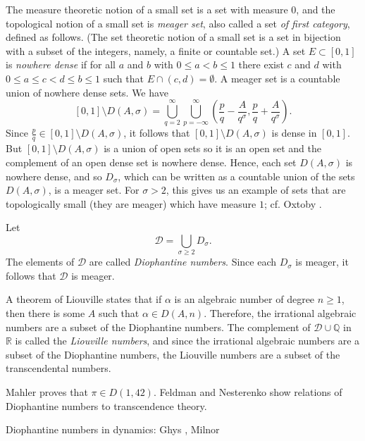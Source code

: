 \documentclass{article}
\begin{document}
The measure theoretic notion of a small set is a set with measure $0$, and  the topological notion of a small set is {\em meager set}, also called a set {\em of first category}, defined as follows. (The set theoretic notion of a small set is a set in bijection with a subset of the integers, namely, a finite or countable set.)
A set $E \subset [0,1]$ is {\em nowhere dense} if for all $a$ and $b$ with $0 \leq a<b \leq 1$ there exist $c$ and $d$ with $0 \leq a \leq c < d \leq b \leq 1$ such that $E \cap (c,d)=\emptyset$. A meager set is a countable union of nowhere dense sets. We have
\[
[0,1] \setminus D(A,\sigma)=\bigcup_{q=2}^\infty \bigcup_{p=-\infty}^\infty \left(\frac{p}{q}-\frac{A}{q^\sigma},\frac{p}{q}+\frac{A}{q^\sigma}\right).
\]
Since $\frac{p}{q} \in [0,1] \setminus D(A,\sigma)$, it follows that $[0,1] \setminus D(A,\sigma)$ is dense in $[0,1]$. But $[0,1] \setminus D(A,\sigma)$ is a union of open sets so it is an open set and the complement of an open dense set is nowhere dense. Hence, each set $D(A,\sigma)$ is nowhere dense, and so $D_\sigma$, which can be written as a countable union of
the sets $D(A,\sigma)$, is a meager set. For $\sigma>2$, this gives us an example of sets that are topologically small (they are meager) which have measure $1$; cf. 
Oxtoby \cite[Chapter 2]{oxtoby}.

Let
\[
\mathscr{D}=\bigcup_{\sigma \geq 2} D_\sigma.
\]
The elements of $\mathscr{D}$ are called {\em Diophantine numbers}. Since each $D_\sigma$ is meager, it follows that $\mathscr{D}$ is meager.

A theorem of Liouville states that if $\alpha$ is an algebraic number of degree $n \geq 1$, then there is some $A$ such that $\alpha
\in D(A,n)$. Therefore, the irrational algebraic numbers are a subset of the Diophantine numbers. The complement of $\mathscr{D} \cup \mathbb{Q}$ in $\mathbb{R}$ is called
the {\em Liouville numbers}, and since the irrational algebraic numbers are a subset of the Diophantine numbers, the Liouville numbers are a subset of the transcendental numbers. 

Mahler proves that $\pi \in D(1,42)$. Feldman and Nesterenko show relations of Diophantine numbers to transcendence theory.


Diophantine numbers in dynamics: Ghys \cite{MR2376785}, Milnor \cite{milnor}



\end{document}
